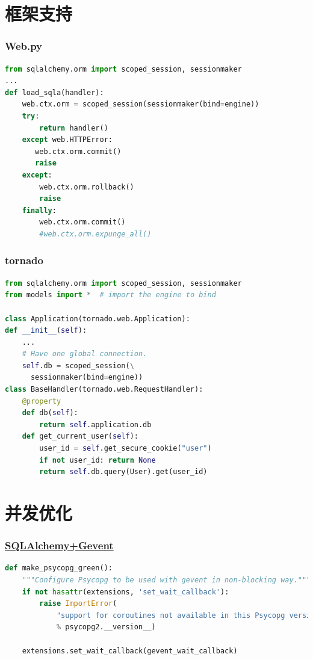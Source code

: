 \documentclass{beamer}
\begin{document}
\section{框架支持}

\begin{frame}[containsverbatim]
  \frametitle{Web.py}
  \begin{lstlisting}[language=python]
from sqlalchemy.orm import scoped_session, sessionmaker
...
def load_sqla(handler):
    web.ctx.orm = scoped_session(sessionmaker(bind=engine))
    try:
        return handler()
    except web.HTTPError:
       web.ctx.orm.commit()
       raise
    except:
        web.ctx.orm.rollback()
        raise
    finally:
        web.ctx.orm.commit()
        #web.ctx.orm.expunge_all() 
  \end{lstlisting}
\end{frame}

\begin{frame}[containsverbatim]
  \frametitle{tornado}
  \begin{lstlisting}[language=python]
from sqlalchemy.orm import scoped_session, sessionmaker
from models import *  # import the engine to bind

class Application(tornado.web.Application):
def __init__(self):
    ...
    # Have one global connection.
    self.db = scoped_session(\
      sessionmaker(bind=engine))
class BaseHandler(tornado.web.RequestHandler):
    @property
    def db(self):
        return self.application.db
    def get_current_user(self):
        user_id = self.get_secure_cookie("user")
        if not user_id: return None
        return self.db.query(User).get(user_id)
  \end{lstlisting}
\end{frame}

\section{并发优化}
\begin{frame}[containsverbatim]
  \frametitle{\href{https://bitbucket.org/zzzeek/green_sqla/src/2732bb7ea9d06b9d4a61e8cd587a95148ce2599b/green_sqla/psyco_gevent.py?at=default}{SQLAlchemy+Gevent}}
  \begin{lstlisting}[language=python]
def make_psycopg_green():
    """Configure Psycopg to be used with gevent in non-blocking way."""
    if not hasattr(extensions, 'set_wait_callback'):
        raise ImportError(
            "support for coroutines not available in this Psycopg version (%s)"
            % psycopg2.__version__)

    extensions.set_wait_callback(gevent_wait_callback)
  \end{lstlisting}
\end{frame}
\end{document}
